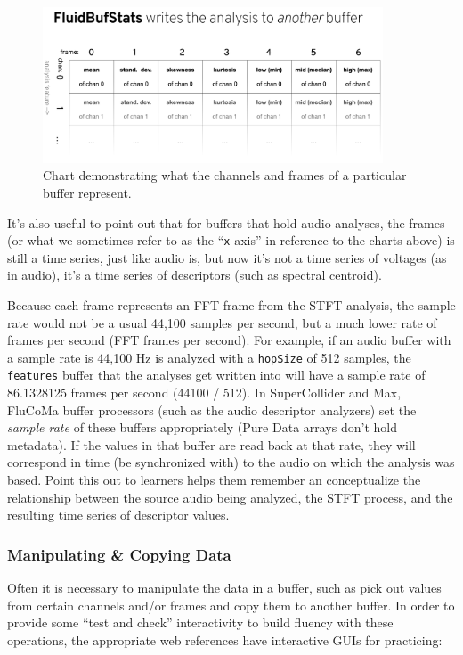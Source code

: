 \documentclass{article}
\begin{document}
\begin{figure}[ht]
\centering
\includegraphics[width=0.9\textwidth]{./figures/bufstats-chart.png}
\caption{Chart demonstrating what the channels and frames of a particular buffer represent.}
\label{fig:bufstats-chart}
\end{figure}

It's also useful to point out that for buffers that hold audio analyses,
the frames (or what we sometimes refer to as the ``\texttt{x} axis'' in
reference to the charts above) is still a time series, just like audio
is, but now it's not a time series of voltages (as in audio), it's a
time series of descriptors (such as spectral centroid).

Because each frame represents an FFT frame from the STFT analysis, the
sample rate would not be a usual 44,100 samples per second, but a much
lower rate of frames per second (FFT frames per second). For example, if
an audio buffer with a sample rate is 44,100 Hz is analyzed with a
\texttt{hopSize} of 512 samples, the \texttt{features} buffer that the
analyses get written into will have a sample rate of 86.1328125 frames
per second (44100 / 512). In SuperCollider and Max, FluCoMa buffer
processors (such as the audio descriptor analyzers) set the \emph{sample
rate} of these buffers appropriately (Pure Data arrays don't hold
metadata). If the values in that buffer are read back at that rate, they
will correspond in time (be synchronized with) to the audio on which the
analysis was based. Point this out to learners helps them remember an conceptualize the relationship between the source audio being analyzed, the STFT process, and the resulting time series of descriptor values.

\subsubsection{Manipulating \& Copying Data}

Often it is necessary to manipulate the data in a buffer, such as pick
out values from certain channels and/or frames and copy them to another
buffer. In order to provide some ``test and check'' interactivity to build
fluency with these operations, the appropriate web references have
interactive GUIs for practicing:
\end{document}

